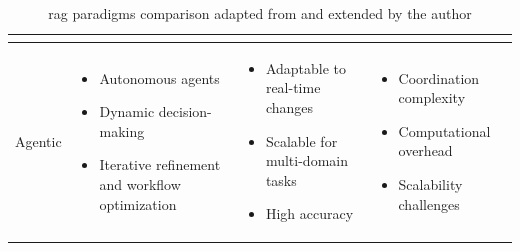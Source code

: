 \begin{table}[htbp]
\begin{tabularx}{\textwidth}{|>{\centering\arraybackslash}p{1.5cm}|X|X|X|}
\begin{itemize}[nosep, left=0pt]
      \end{itemize}\\
      \hline
      \begin{center}
        Agentic
      \end{center} & \begin{itemize}[nosep, left=0pt]
        \item Autonomous agents
        \item Dynamic decision-making
        \item Iterative refinement and workflow optimization
      \end{itemize}& \begin{itemize}[nosep, left=0pt]
        \item Adaptable to real-time changes
        \item Scalable for multi-domain tasks
        \item High accuracy
      \end{itemize} & \begin{itemize}[nosep, left=0pt]
        \item Coordination complexity
        \item Computational overhead
        \item Scalability challenges
      \end{itemize}\\
      \hline
    \end{tabularx}
    \caption{\gls{rag} paradigms comparison adapted from \textcite{singh2025} and extended by the author}
    \label{table:rag-paradigms-comparison}
  \end{table}